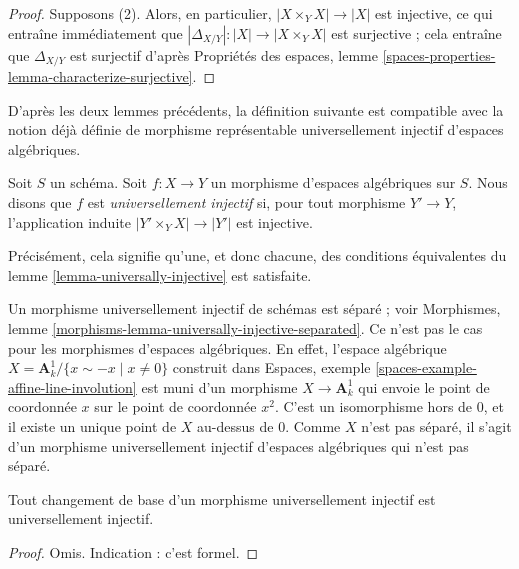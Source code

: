\begin{proof}
\medskip\noindent
Supposons (2). Alors, en particulier, $|X \times_Y X| \to |X|$ est injective,
ce qui entraîne immédiatement que
$|\Delta_{X/Y}| : |X| \to |X \times_Y X|$ est surjective ; cela
entraîne que $\Delta_{X/Y}$ est surjectif d'après
Propriétés des espaces,
lemme \ref{spaces-properties-lemma-characterize-surjective}.
\end{proof}

\noindent
D'après les deux lemmes précédents, la définition suivante est compatible avec
la notion déjà définie de morphisme représentable universellement injectif
d'espaces algébriques.

\begin{definition}
\label{definition-universally-injective}
Soit $S$ un schéma. Soit $f : X \to Y$ un morphisme d'espaces
algébriques sur $S$. Nous disons que $f$ est {\it universellement injectif} si,
pour tout morphisme $Y' \to Y$, l'application induite
$|Y' \times_Y X| \to |Y'|$ est injective.
\end{definition}

\noindent
Précisément, cela signifie qu'une, et donc chacune, des conditions équivalentes du
lemme \ref{lemma-universally-injective}
est satisfaite.

\begin{remark}
\label{remark-universally-injective-not-separated}
Un morphisme universellement injectif de schémas est séparé ; voir
Morphismes, lemme
\ref{morphisms-lemma-universally-injective-separated}.
Ce n'est pas le cas pour les morphismes d'espaces algébriques.
En effet, l'espace algébrique
$X = \mathbf{A}^1_k/\{x \sim -x \mid x \not = 0\}$
construit dans
Espaces, exemple \ref{spaces-example-affine-line-involution}
est muni d'un morphisme $X \to \mathbf{A}^1_k$ qui envoie
le point de coordonnée $x$ sur le point de coordonnée $x^2$.
C'est un isomorphisme hors de $0$, et il existe un unique point
de $X$ au-dessus de $0$. Comme $X$ n'est pas séparé, il s'agit d'un morphisme
universellement injectif d'espaces algébriques qui n'est pas séparé.
\end{remark}

\begin{lemma}
\label{lemma-base-change-universally-injective}
Tout changement de base d'un morphisme universellement injectif est universellement injectif.
\end{lemma}

\begin{proof}
Omis. Indication : c'est formel.
\end{proof}

